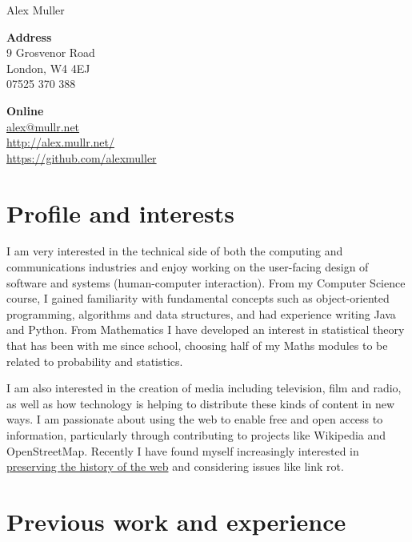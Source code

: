 \documentclass[10pt,a4paper]{article}
\def\name{Alex Muller}
\begin{document}
{\huge \name}

\bigskip

\begin{minipage}[t]{0.26\textwidth}
  \textbf{Address} \\
  9 Grosvenor Road \\
  London, W4 4EJ \\
  07525 370 388 \\
\end{minipage}
\begin{minipage}[t]{0.5\textwidth}
  \textbf{Online} \\
  \href{mailto:alex@mullr.net}{alex@mullr.net} \\
  \href{http://alex.mullr.net/}{http://alex.mullr.net/} \\
  \href{https://github.com/alexmuller}{https://github.com/alexmuller} \\
\end{minipage}

\section*{Profile and interests}

I am very interested in the technical side of both the computing and
communications industries and enjoy working on the user-facing design of
software and systems (human-computer interaction). From my Computer Science
course, I gained familiarity with fundamental concepts such as object-oriented
programming, algorithms and data structures, and had experience writing
Java and Python. From Mathematics I have developed an interest in statistical
theory that has been with me since school, choosing half of my Maths modules
to be related to probability and statistics.

I am also interested in the creation of media including television, film and
radio, as well as how technology is helping to distribute these kinds of
content in new ways. I am passionate about using the web to enable free and
open access to information, particularly through contributing to projects like
Wikipedia and OpenStreetMap. Recently I have found myself increasingly
interested in
\href{http://alex.mullr.net/blog/2011/11/the-web-growing-up/}{preserving the
history of the web} and considering issues like link rot.


\section*{Previous work and experience}
\end{document}
